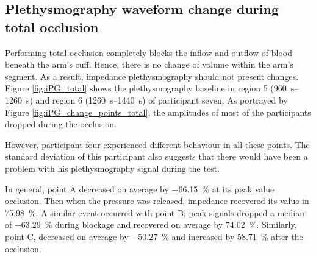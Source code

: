 \subsection{Plethysmography waveform change during total occlusion}
\label{section apa 3.3}
Performing total occlusion completely blocks the inflow and outflow of blood beneath the arm's cuff.  Hence, there is no change of volume within the arm's segment. As a result, impedance plethysmography should not present changes.  Figure \ref{fig:iPG_total} shows the plethysmography baseline in region 5 (\SIrange{960}{1260}{\second}) and region 6  (\SIrange{1260}{1440}{\second}) of participant seven. As portrayed by Figure \ref{fig:iPG_change_points_total}, the amplitudes of most of the participants dropped during the occlusion.

However, participant four experienced different behaviour in all these points. The standard deviation of this participant also suggests that there would have been a problem with his plethysmography signal during the test. 

In general, point A decreased on average by \SI{-66.15}{\percent} at its peak value occlusion. Then when the pressure was released, impedance recovered its value in \SI{75.98}{\percent}. A similar event occurred with point B; peak signals dropped a median of \SI{-63.29}{\percent} during blockage and recovered on average by \SI{74.02}{\percent}. Similarly, point C, decreased on average by \SI{-50.27}{\percent}  and increased by \SI{58.71}{\percent} after the occlusion.

